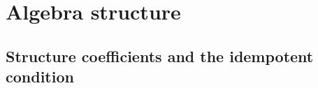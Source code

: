 \section{Algebra structure}



\subsection{Structure coefficients and the idempotent condition}







